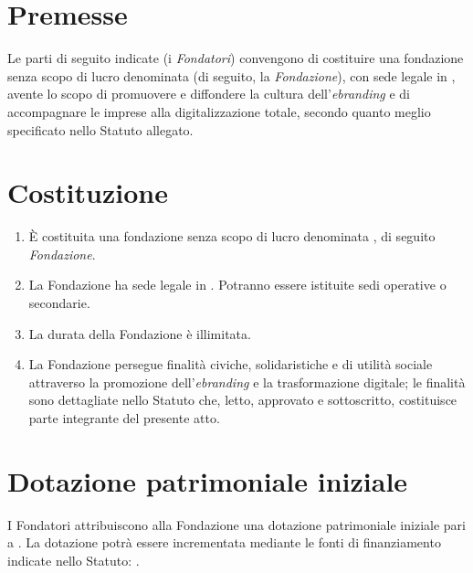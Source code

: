 \begin{center}
\end{center}

\maketitle

\section*{Premesse}
Le parti di seguito indicate (i \emph{Fondatori}) convengono di costituire una fondazione senza scopo di lucro denominata  (di seguito, la \emph{Fondazione}), con sede legale in \FondazioneSedeLegale, avente lo scopo di promuovere e diffondere la cultura dell'\emph{ebranding} e di accompagnare le imprese alla digitalizzazione totale, secondo quanto meglio specificato nello Statuto allegato.

\section*{Costituzione}
\begin{enumerate}[label=\arabic*)]
  \item È costituita una fondazione senza scopo di lucro denominata , di seguito \emph{Fondazione}.
  \item La Fondazione ha sede legale in . Potranno essere istituite sedi operative o secondarie.
  \item La durata della Fondazione è illimitata.
  \item La Fondazione persegue finalità civiche, solidaristiche e di utilità sociale attraverso la promozione dell'\emph{ebranding} e la trasformazione digitale; le finalità sono dettagliate nello Statuto che, letto, approvato e sottoscritto, costituisce parte integrante del presente atto.
\end{enumerate}

\section*{Dotazione patrimoniale iniziale}
I Fondatori attribuiscono alla Fondazione una dotazione patrimoniale iniziale pari a . La dotazione potrà essere incrementata mediante le fonti di finanziamento indicate nello Statuto: \FontiFinanziamento.

